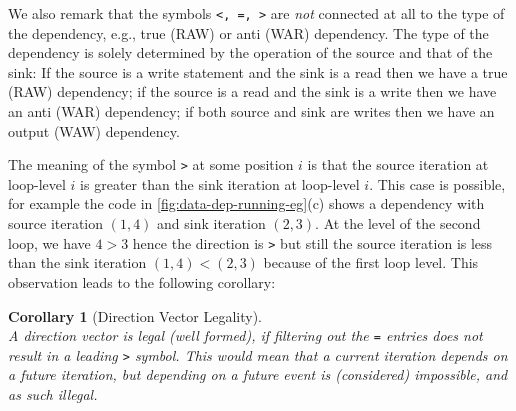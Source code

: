 \documentclass[acmsmall,review]{acmart}\settopmatter{printfolios=true,printccs=false,printacmref=false}
\newtheorem{mycorol}{Corollary}
\begin{document}
We also remark that the symbols {\tt <, =, >} are \emph{not} connected at
all to the type of the dependency, e.g., true (RAW) or anti (WAR) dependency. 
The type of the dependency is solely determined by the operation of the
source and that of the sink: If the source is a write statement and the 
sink is a read then we have a true (RAW) dependency; if the source is a 
read and the sink is a write then we have an anti (WAR) dependency;
if both source and sink are writes then we have an output (WAW) dependency.  

The meaning of the symbol {\tt>} at some position $i$ is that
the source iteration at loop-level $i$ is greater than the sink
iteration at loop-level $i$. This case is possible, for example
the code in \cref{fig:data-dep-running-eg}(c) shows a dependency
with source iteration $(1,4)$ and sink iteration $(2,3)$. At the
level of the second loop, we have $4 > 3$ hence the direction
is {\tt >} but still the source iteration is less than the sink
iteration $(1,4) < (2,3)$ because of the first loop level.
This observation leads to the following corollary:

\begin{mycorol}[Direction Vector Legality]\label{Leg-Dir-Vect}
$\mbox{ }$\\
A direction vector is legal (well formed), if filtering out 
the {\tt =} entries does \emph{not} result in a leading {\tt>}
symbol. This would mean that a current iteration depends on
a future iteration, but depending on a future event is (considered)
impossible, and as such illegal.
\end{mycorol}
\end{document}
